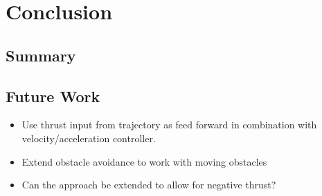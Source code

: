 \chapter{Conclusion}\label{chap:conclusion}
\section{Summary}
\section{Future Work}
\begin{itemize}
    \item Use thrust input from trajectory as feed forward in combination with velocity/acceleration controller.
    \item Extend obstacle avoidance to work with moving obstacles
    \item Can the approach be extended to allow for negative thrust?
\end{itemize}
